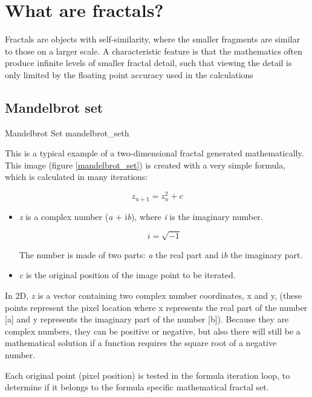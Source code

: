 \section{What are fractals?}\label{what-are-fractals}

Fractals are objects with self-similarity, where the smaller fragments are
similar to those on a larger scale. A characteristic feature is that the mathematics often produce infinite levels of smaller fractal detail, such that viewing the detail is only limited by the floating point accuracy used in the calculations

\subsection{Mandelbrot set}\label{mandelbrot-set}

{Mandelbrot Set}
{mandelbrot_set}{h}

This is a typical example of a two-dimensional fractal generated mathematically.
This image (figure \ref{mandelbrot_set}) is created with a very simple formula, which is calculated in many
iterations:

\[z_{n + 1} = z_{n}^{2} + c\]

\begin{itemize}
		
		
	\item\emph{z} is a complex number (\emph{a} + i\emph{b}), where \emph{i} is
	the imaginary number.
		
	\[ i = \sqrt{-1} \]
		
	The number is made of two parts: \emph{a} the real part and i\emph{b} the
	imaginary part.
		
	\item\emph{c} is the original position of the image point to be iterated.
\end{itemize}

In 2D, \emph{z} is a vector containing two complex number coordinates, x and y,
(these points represent the pixel location where x represents the real part of
the number {[}a{]} and y represents the imaginary part of the number {[}b{]}).
Because they are complex numbers, they can be positive or negative, but also
there will still be a mathematical solution if a function requires the square
root of a negative number.

Each original point (pixel position) is tested in the formula iteration loop, to
determine if it belongs to the formula specific mathematical fractal set.

